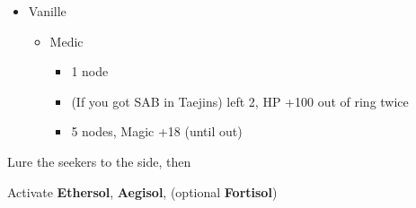 \begin{multicols}{2}
\begin{menu}
\begin{itemize}
\begin{itemize}
\begin{itemize}
				      \end{itemize}
				\item Vanille
				      \begin{itemize}
					      \item Medic
					            \begin{itemize}
						            \item 1 node
						            \item (If you got SAB in Taejins) left 2, HP +100 out of ring twice
						            \item 5 nodes, Magic +18 (until out)
					            \end{itemize}
				      \end{itemize}
			\end{itemize}
		\end{itemize}
	\end{menu}


	Lure the seekers to the side, then 
\end{multicols}
Activate \textbf{Ethersol}, \textbf{Aegisol}, (optional \textbf{Fortisol})
\renewcommand{\first}{[1] Guerilla (\syn/\rav/\sab)}
\renewcommand{\second}{[2] Tri-Disaster (\rav/\rav/\rav)}
\renewcommand{\third}{[3] Thaumaturgy (\rav/\rav/\med)}
\renewcommand{\fourth}{[4] Tireless Charge (\com/\com/\med)}
\renewcommand{\fifth}{[5] Smart Bomb (\rav/\rav/\sab)}
\renewcommand{\sixth}{[6] Aggression (\com/\com/\rav)}
